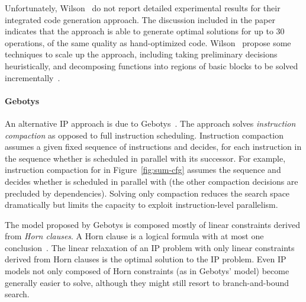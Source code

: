 \documentclass[acmsmall,authorversion,nonacm]{acmart}
\begin{document}
Unfortunately, Wilson~\etal{} do not report detailed experimental
results for their integrated code generation approach.
The discussion included in the paper indicates that the approach is
able to generate optimal solutions for up to 30 operations, of the
same quality as hand-optimized code.
Wilson~\etal{} propose some techniques to scale up the approach,
including taking preliminary decisions heuristically, and decomposing
functions into regions of basic blocks to be solved
incrementally~\cite{Wilson2002}.

\paragraph{Gebotys}

An alternative IP approach is due to Gebotys~\cite{Gebotys1997}.
The approach solves \emph{instruction compaction} as opposed to full
instruction scheduling.
Instruction compaction assumes a given fixed sequence of instructions
and decides, for each instruction  in the sequence whether  is
scheduled in parallel with its successor.
For example, instruction compaction for  in
Figure~\ref{fig:sum-cfg} assumes the sequence
 and
decides whether  is scheduled in parallel with
 (the other compaction decisions are precluded by
dependencies).
Solving only compaction reduces the search space dramatically but
limits the capacity to exploit instruction-level parallelism.

The model proposed by Gebotys is composed mostly of linear constraints
derived from \emph{Horn clauses}.
A Horn clause is a logical formula with at most one
conclusion~\cite{Horn1951}.
The linear relaxation of an IP problem with only linear constraints
derived from Horn clauses is the optimal solution to the IP problem.
Even IP models not only composed of Horn constraints (as in Gebotys'
model) become generally easier to solve, although they might still
resort to branch-and-bound search.
\end{document}
